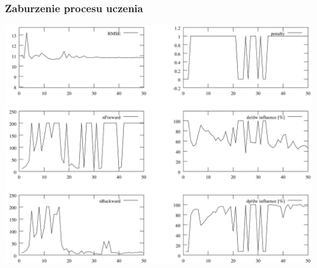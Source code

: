 \documentclass{beamer}
\begin{document}
\begin{frame}
\frametitle{Zaburzenie procesu uczenia}
\begin{center}
	\includegraphics[scale=0.06]{img/gnn1_3}
\end{center}
\end{frame}
\end{document}
